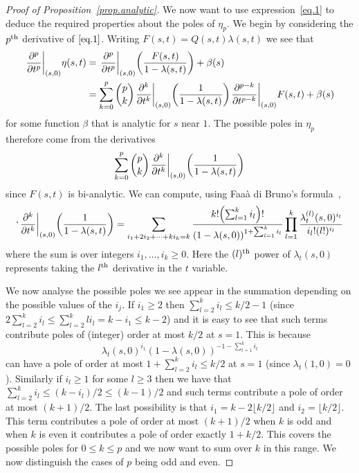 \documentclass[10pt]{amsart}
\theoremstyle{definition}\newtheorem{defi}[theo]{Definition}\newtheorem{rema}[theo]{Remark}\newtheorem{exam}[theo]{Example}\newtheorem{exem}[theo]{Example}\newtheorem{nota}[theo]{Notation}
\let\originalleft\left
\let\originalright\right
\renewcommand{\left}{\mathopen{}\mathclose\bgroup\originalleft}
\renewcommand{\right}{\aftergroup\egroup\originalright}
\newcounter{setofcase}
\newcounter{case}[setofcase]
\theoremstyle{plain}
\begin{document}
\begin{proof}[Proof of Proposition~\ref{prop.analytic}]
We now want to use expression~\eqref{eq.1} to deduce the required properties about the poles of $\eta_p$. We begin by considering the $p^{\rm th}$ derivative of $\eqref{eq.1}$. Writing $F(s,t) = Q(s,t) \lambda(s,t)$ we see that
\begin{align*}
\left.\frac{\partial^p }{\partial t^p}\right|_{(s,0)} \eta(s,t) &= \left.\frac{\partial^p }{\partial t^p}\right|_{(s,0)} \left(\frac{F(s,t)}{1 - \lambda(s,t)} \right) + \beta(s) \\
&= \sum_{k=0}^p\binom {p}{k}\left. \frac{\partial^k }{\partial t^k}\right|_{(s,0)} \left(\frac{1}{1 - \lambda(s,t)} \right) \left. \frac{\partial^{p-k} }{\partial t^{p-k}}\right|_{(s,0)} F(s,t) + \beta(s)
\end{align*}
for some function $\beta$ that is analytic for $s$ near $1$. The possible poles in $\eta_p$ therefore come from the derivatives
\begin{equation}\label{eq.2}
\sum_{k=0}^p\binom { p}{k}\left. \frac{\partial^k }{\partial t^k}\right|_{(s,0)} \left(\frac{1}{1 - \lambda(s,t)} \right)
\end{equation}
since $F(s,t)$ is bi-analytic. We can compute, using Faaà di Bruno's formula~\cite{Faa},
\[`
\left. \frac{\partial^k }{\partial t^k}\right|_{(s,0)} \left(\frac{1}{1 - \lambda(s,t)} \right) = \sum_{i_1 + 2i_2 + \dots + ki_k = k} \frac{k! \left(\sum_{l=1}^k i_l\right)!}{(1 - \lambda(s,0))^{1 + \sum_{l=1}^k i_l}} \prod_{l=1}^k \frac{\lambda_t^{(l)}(s,0)^{i_l}}{i_l!(l!)^{i_l}}
\]
where the sum is over integers $i_1, \dots, i_k \ge 0$. Here the $(l)^{\rm th}$ power of $\lambda_t(s,0)$ represents taking the $l^{\rm th}$ derivative in the $t$ variable.

We now analyse the possible poles we see appear in the summation depending on the possible values of the $i_j$. If $i_1 \ge 2$ then $\sum_{l=2}^k i_l \le k/2 - 1$ (since $2\sum_{l=2}^k i_l \le \sum_{l=2}^k li_l = k - i_1 \le k - 2$) and it is easy to see that such terms contribute poles of (integer) order at most $k/2$ at $s=1$. This is because
\[
\lambda_t(s,0)^{i_1}(1-\lambda(s,0))^{-1-\sum\limits_{l=1}^k i_l}
\]
can have a pole of order at most $1+\sum_{l=2}^k i_l \le k/2$ at $s=1$ (since $\lambda_t(1,0)=0$). Similarly if $i_l \ge 1$ for some $l \ge 3$ then we have that $\sum_{l=2}^k i_l \le (k-i_l)/2 \le(k- 1)/2 $ and such terms contribute a pole of order at most $(k+1)/2$. The last possibility is that $i_1 = k - 2\lfloor k/2 \rfloor$ and $i_2 = \lfloor k/2 \rfloor$. This term contributes a pole of order at most $(k+1)/2$ when $k$ is odd and when $k$ is even it contributes a pole of order exactly $1+k/2$. This covers the possible poles for $0 \le k \le p$ and we now want to sum over $k$ in this range. We now distinguish the cases of $p$ being odd and even.


\end{proof}
\end{document}
